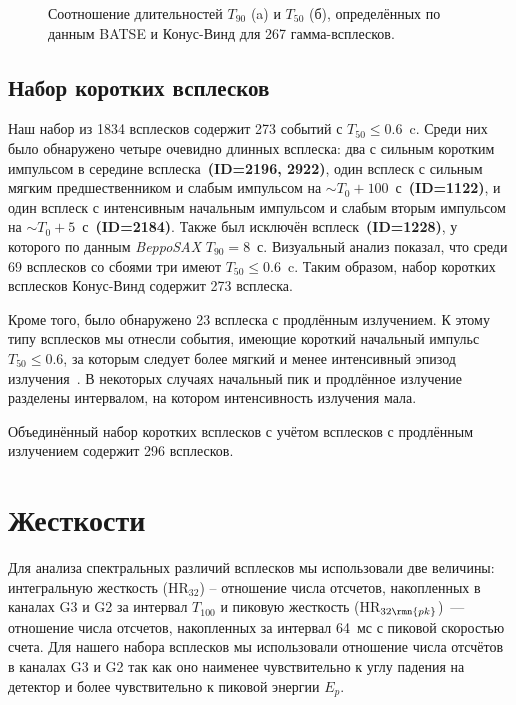 \begin{figure}[h]
  \begin{minipage}[h]{0.5\textwidth}
  \end{minipage}
  \hfill
  \begin{minipage}[h]{0.5\textwidth}
  \end{minipage}
  \caption{Соотношение длительностей $T_{90}$ (a) и $T_{50}$ (б), определённых по 
  данным BATSE и Конус-Винд для 267 гамма-всплесков.}
  \label{img:T90andT50_KWvsBATSE}  
\end{figure}

\subsection{Набор коротких всплесков}
Наш набор из 1834 всплесков содержит 273 событий с $T_{50} \leq 0.6$~c. 
Среди них было обнаружено четыре очевидно длинных всплеска: два с сильным коротким 
импульсом в середине всплеска~\textbf{(ID=2196, 2922)}, один всплеск с сильным мягким 
предшественником и слабым импульсом на $\sim T_0+100$~с~\textbf{(ID=1122)}, 
и один всплеск с интенсивным начальным импульсом и слабым вторым импульсом на 
$\sim T_0+5$~с~\textbf{(ID=2184)}. Также был исключён всплеск~\textbf{(ID=1228)}, 
у которого по данным \textit{BeppoSAX} $T_{90} = 8$~с. Визуальный анализ показал, 
что среди 69 всплесков со сбоями три имеют $T_{50} \leq 0.6$~c. Таким образом, 
набор коротких всплесков Конус-Винд содержит 273 всплеска.

Кроме того, было обнаружено 23 всплеска с продлённым излучением. К этому типу 
всплесков мы отнесли события, имеющие короткий начальный импульс $T_{50} \leq 0.6$, 
за которым следует более мягкий и менее интенсивный эпизод 
излучения~\citep{Frederiks_2004_EE, Norris2011, Norris_and_Bonnel_2006}. 
В некоторых случаях начальный пик и продлённое излучение разделены интервалом, 
на котором интенсивность излучения мала.

Объединённый набор коротких всплесков с учётом всплесков с продлённым излучением 
содержит 296 всплесков.

\clearpage

\section{Жесткости}\label{sec:Hardness}
Для анализа спектральных различий всплесков мы использовали две величины: интегральную 
жесткость (HR$_{32}$) -- отношение числа отсчетов, накопленных в каналах G3 и G2 
за интервал $T_{100}$ и пиковую жесткость (HR$_{32\rmn{pk}}$)~--- отношение числа отсчетов, 
накопленных за интервал 64~мс с пиковой скоростью счета. Для нашего набора 
всплесков мы использовали отношение числа отсчётов в каналах G3 и G2 так как 
оно наименее чувствительно к углу падения на детектор и более чувствительно 
к пиковой энергии $E_p$.  

